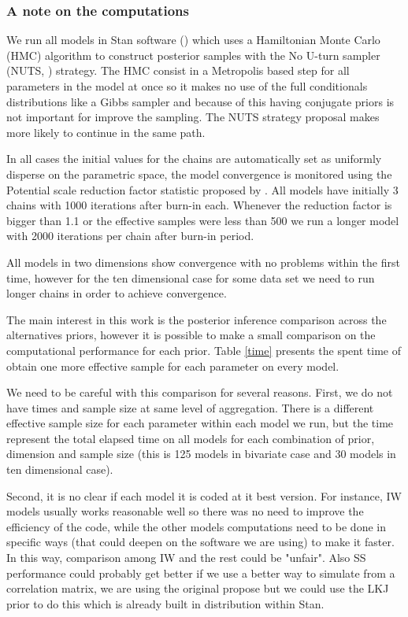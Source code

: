 \documentclass{article}
\begin{document}
\subsubsection{A note on the computations}
We run all models in Stan software (\cite{stan2014}) which uses a Hamiltonian Monte Carlo (HMC) algorithm to construct posterior samples with the No U-turn sampler (NUTS, \cite{hoffman2011no}) strategy. The HMC consist in a Metropolis based step for all parameters in the model at once so it makes no use of the full conditionals distributions like a Gibbs sampler and because of this having conjugate priors is not important for improve the sampling. The NUTS strategy proposal makes more likely to continue in the same path.  

In all cases the initial values for the chains are automatically set as uniformly disperse on the parametric space, the model convergence is monitored using the Potential scale reduction factor statistic proposed by \cite{bda2003}. All models have initially 3 chains with 1000 iterations after burn-in each. Whenever the reduction factor is bigger than 1.1 or the effective samples were less than 500 we run a longer model with 2000 iterations per chain after burn-in period. 



All models in two dimensions show convergence with no problems within the first time, however for the ten dimensional case for some data set we need to run longer chains in order to achieve convergence. 

The main interest in this work is the posterior inference comparison across the alternatives priors, however it is possible to make a small comparison on the computational performance for each prior. Table \ref{time} presents the spent time of obtain one more effective sample for each parameter on every model. 

We need to be careful with this comparison for several reasons. First, we do not have times and sample size at same level of aggregation.  There is a different effective sample size for each parameter within each model we run, but the time represent the total elapsed time on all models for each combination of prior, dimension and sample size (this is 125 models in bivariate case and 30 models in ten dimensional case).

Second, it is no clear if each model it is coded at it best version.  For instance, IW models usually works reasonable well so there was no need to improve the efficiency of the code, while the other models computations need to be done in specific ways (that could deepen on the software we are using) to make it faster. In this way, comparison among IW and the rest could be "unfair".  Also SS performance could  probably get better if we use a better way to simulate from a correlation matrix, we are using the \cite{barnard2000} original propose but we could use the LKJ prior to do this which is already built in distribution within Stan. 
\end{document}
